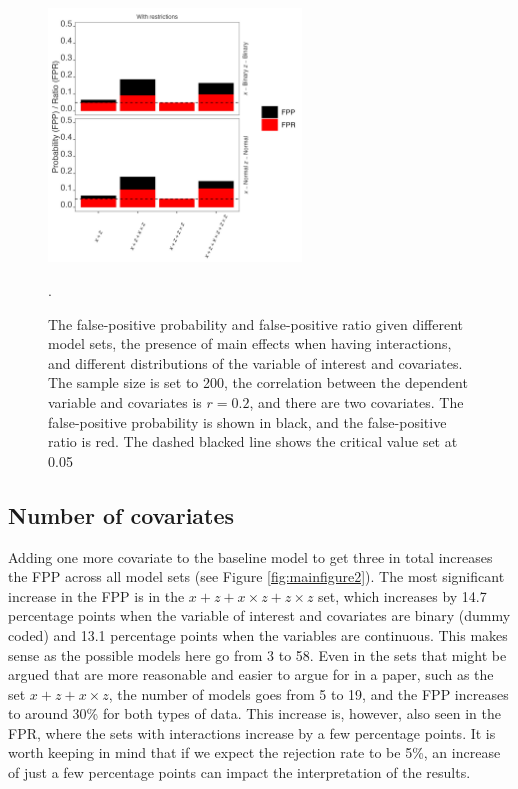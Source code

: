 \begin{figure}[hbt!]
\includegraphics[width=0.6\textwidth]{R/Analysis/Result/Figures/Figure1A_with.jpeg}
\centering
\caption{The false-positive probability and false-positive ratio given different model sets, the presence of main effects when having interactions, and different distributions of the variable of interest and covariates. The sample size is set to 200, the correlation between the dependent variable and covariates is $r=0.2$, and there are two covariates. The false-positive probability is shown in black, and the false-positive ratio is red. The dashed blacked line shows the critical value set at 0.05 }.
\label{fig:mainfigure1}
\end{figure}

\subsection{Number of covariates}
Adding one more covariate to the baseline model to get three in total increases the FPP across all model sets (see Figure \ref{fig:mainfigure2}).  The most significant increase in the FPP is in the $x + z+ x \times z + z \times z$ set, which increases by 14.7 percentage points when the variable of interest and covariates are binary (dummy coded) and 13.1 percentage points when the variables are continuous. This makes sense as the possible models here go from 3 to 58. Even in the sets that might be argued that are more reasonable and easier to argue for in a paper, such as the set $x + z+ x \times z $, the number of models goes from 5 to 19, and the FPP increases to around 30\% for both types of data. This increase is, however, also seen in the FPR, where the sets with interactions increase by a few percentage points. It is worth keeping in mind that if we expect the rejection rate to be 5\%, an increase of just a few percentage points can impact the interpretation of the results.  

